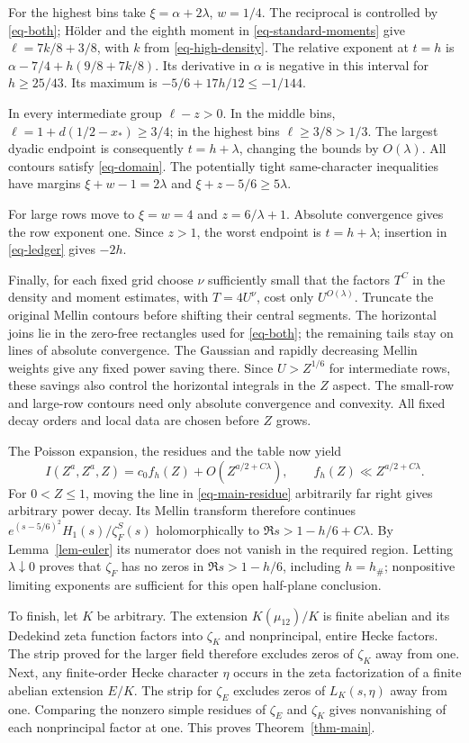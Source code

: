 \documentclass[11pt,a4paper]{article}
\numberwithin{equation}{section}
\theoremstyle{remark}
\begin{document}
For the highest bins take $\xi=\alpha+2\lambda$, $w=1/4$.
The reciprocal is controlled by \eqref{eq-both}; H\"older and
the eighth moment in \eqref{eq-standard-moments} give
$\ell=7k/8+3/8$, with $k$ from \eqref{eq-high-density}.
The relative exponent at $t=h$ is
$\alpha-7/4+h(9/8+7k/8)$.  Its derivative in $\alpha$ is
negative in this interval for $h\ge25/43$.  Its maximum is
$-5/6+17h/12\le-1/144$.

In every intermediate group $\ell-z>0$.  In the middle bins,
$\ell=1+d(1/2-x_*)\ge3/4$; in the highest bins
$\ell\ge3/8>1/3$.  The largest dyadic endpoint is consequently
$t=h+\lambda$, changing the bounds by $O(\lambda)$.
All contours satisfy \eqref{eq-domain}.  The potentially tight
same-character inequalities have margins
$\xi+w-1=2\lambda$ and $\xi+z-5/6\ge5\lambda$.

For large rows move to $\xi=w=4$ and $z=6/\lambda+1$.
Absolute convergence gives the row exponent one.  Since $z>1$,
the worst endpoint is $t=h+\lambda$; insertion in
\eqref{eq-ledger} gives $-2h$.

Finally, for each fixed grid choose $\nu$ sufficiently small
that the factors $T^C$ in the density and moment estimates,
with $T=4U^\nu$, cost only $U^{O(\lambda)}$.
Truncate the original Mellin contours before shifting their central
segments.  The horizontal joins lie in the zero-free rectangles
used for \eqref{eq-both}; the remaining tails stay on lines of
absolute convergence.  The Gaussian and rapidly decreasing
Mellin weights give any fixed power saving there.  Since
$U>Z^{1/6}$ for intermediate rows, these savings also control
the horizontal integrals in the $Z$ aspect.  The small-row and
large-row contours need only absolute convergence and convexity.
All fixed decay orders and local data are chosen before $Z$ grows.

The Poisson expansion, the residues and the table now yield
\[
 I(Z^a,Z^a,Z)=c_0f_h(Z)+O(Z^{a/2+C\lambda}),
 \qquad f_h(Z)\ll Z^{a/2+C\lambda}.
\]
For $0<Z\le1$, moving the line in \eqref{eq-main-residue}
arbitrarily far right gives arbitrary power decay.  Its Mellin
transform therefore continues
$e^{(s-5/6)^2}H_1(s)/\zeta_F^S(s)$ holomorphically to
$\Re s>1-h/6+C\lambda$.  By Lemma~\ref{lem-euler} its numerator
does not vanish in the required region.  Letting
$\lambda\downarrow0$ proves that $\zeta_F$ has no zeros in
$\Re s>1-h/6$, including $h=h_\#$; nonpositive limiting
exponents are sufficient for this open half-plane conclusion.

To finish, let $K$ be arbitrary.  The extension $K(\mu_{12})/K$
is finite abelian and its Dedekind zeta function factors into
$\zeta_K$ and nonprincipal, entire Hecke factors.  The strip
proved for the larger field therefore excludes zeros of
$\zeta_K$ away from one.  Next, any finite-order Hecke character
$\eta$ occurs in the zeta factorization of a finite abelian
extension $E/K$.  The strip for $\zeta_E$ excludes zeros of
$L_K(s,\eta)$ away from one.  Comparing the nonzero simple
residues of $\zeta_E$ and $\zeta_K$ gives nonvanishing of each
nonprincipal factor at one.  This proves Theorem~\ref{thm-main}.
\end{document}
